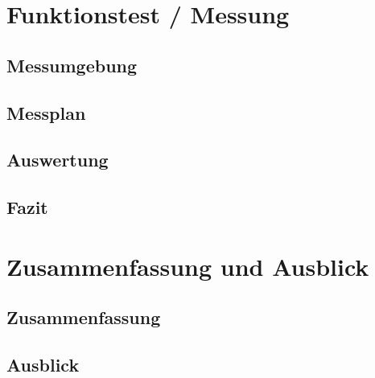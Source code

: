 \documentclass[a4paper, 11pt, toc=bibliography, toc=listof]{scrbook}
\begin{document}


	\chapter{Funktionstest / Messung} %
	\label{cha:Funktionstest}
	
		\section{Messumgebung} %
		\label{sec:Messumgebung}
			

		\section{Messplan} %
		\label{sec:Messplan}
			

		\section{Auswertung} %
		\label{sec:Auswertung}
			

		\section{Fazit} %
		\label{sec:Fazit}
		


	\chapter{Zusammenfassung und Ausblick} %
	\label{cha:Zusammenfassung}

		\section{Zusammenfassung} %
		\label{sec:Zusammenfassung}
			

		\section{Ausblick} %
		\label{sec:Ausblick}
		
\end{document}
